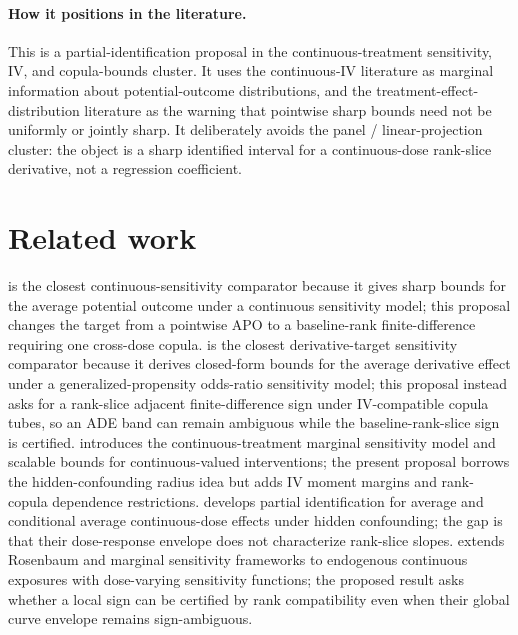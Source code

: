 \documentclass[11pt]{article}
\theoremstyle{definition}
\theoremstyle{plain}
\theoremstyle{remark}
\begin{document}
\paragraph{How it positions in the literature.}
This is a partial-identification proposal in the continuous-treatment sensitivity, IV, and copula-bounds cluster.  It uses the continuous-IV literature as marginal information about potential-outcome distributions, and the treatment-effect-distribution literature as the warning that pointwise sharp bounds need not be uniformly or jointly sharp.  It deliberately avoids the panel / linear-projection cluster: the object is a sharp identified interval for a continuous-dose rank-slice derivative, not a regression coefficient.

\section{Related work}
\citet{BaitairianSebastienJreichKatsahianGuilloux2025} is the closest continuous-sensitivity comparator because it gives sharp bounds for the average potential outcome under a continuous sensitivity model; this proposal changes the target from a pointwise APO to a baseline-rank finite-difference requiring one cross-dose copula.  \citet{Zhang2025ADE} is the closest derivative-target sensitivity comparator because it derives closed-form bounds for the average derivative effect under a generalized-propensity odds-ratio sensitivity model; this proposal instead asks for a rank-slice adjacent finite-difference sign under IV-compatible copula tubes, so an ADE band can remain ambiguous while the baseline-rank-slice sign is certified.  \citet{JessonDouglasManshausenSolalMeinshausenStierGalShalit2022} introduces the continuous-treatment marginal sensitivity model and scalable bounds for continuous-valued interventions; the present proposal borrows the hidden-confounding radius idea but adds IV moment margins and rank-copula dependence restrictions.  \citet{MarmarelisHaddadJessonJahanshadGalstyanVerSteeg2023} develops partial identification for average and conditional average continuous-dose effects under hidden confounding; the gap is that their dose-response envelope does not characterize rank-slice slopes.  \citet{DalalTchetgenTchetgen2025} extends Rosenbaum and marginal sensitivity frameworks to endogenous continuous exposures with dose-varying sensitivity functions; the proposed result asks whether a local sign can be certified by rank compatibility even when their global curve envelope remains sign-ambiguous.
\end{document}
